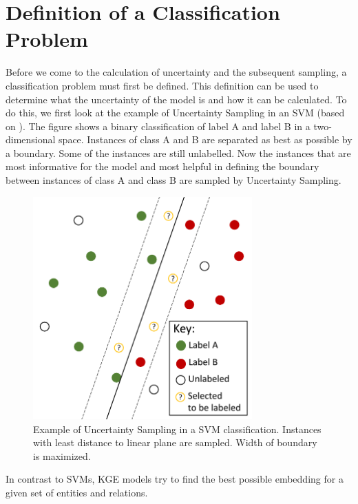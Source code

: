 \section{Definition of a Classification Problem}
\label{sec:definition_of_a_classification_problem}

Before we come to the calculation of uncertainty and the subsequent sampling, a classification problem must first be defined.
This definition can be used to determine what the uncertainty of the model is and how it can be calculated.
To do this, we first look at the example of  Uncertainty Sampling in an \ac{SVM} (based on \cite{human-in-the-loop}).
The figure shows a binary classification of label A and label B in  a two-dimensional space.
Instances of class A and B are separated as best as possible by a boundary.
Some of the instances are still unlabelled.
Now the instances that are most informative for the model and most helpful in defining the boundary between instances of class A and class B are sampled by Uncertainty Sampling.
\begin{figure}[t]
  \centering
    \includegraphics[width=0.75\textwidth]{figures/SVM.pdf}
  \caption{Example of Uncertainty Sampling in a \ac{SVM} classification. Instances with least distance to linear plane are sampled. Width of boundary is maximized.}
  \label{fig:svm}
\end{figure}
In contrast to \acp{SVM}, \ac{KGE} models try to find the best possible embedding for a given set of entities and relations.

